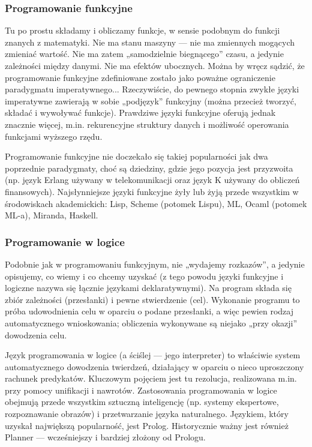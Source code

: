 \documentclass[a4paper,12pt,oneside]{book}
\begin{document}
				\subsubsection{Programowanie funkcyjne}
				Tu po prostu składamy i obliczamy funkcje, w sensie podobnym do funkcji znanych z matematyki. Nie ma stanu maszyny — nie ma zmiennych mogących zmieniać wartość. Nie ma zatem „samodzielnie biegnącego” czasu, a jedynie zależności między danymi. Nie ma efektów ubocznych. Można by wręcz sądzić, że programowanie funkcyjne zdefiniowane zostało jako poważne ograniczenie paradygmatu imperatywnego... Rzeczywiście, do pewnego stopnia zwykłe języki imperatywne zawierają w sobie „podjęzyk” funkcyjny (można przecież tworzyć, składać i wywoływać funkcje). Prawdziwe języki funkcyjne oferują jednak znacznie więcej, m.in. rekurencyjne struktury danych i możliwość operowania funkcjami wyższego rzędu.
				
				Programowanie funkcyjne nie doczekało się takiej popularności jak dwa poprzednie paradygmaty, choć są dziedziny, gdzie jego pozycja jest przyzwoita (np. język Erlang używany w telekomunikacji oraz język K używany do obliczeń finansowych). Najsłynniejsze języki funkcyjne żyły lub żyją przede wszystkim w środowiskach akademickich: Lisp, Scheme (potomek Lispu), ML, Ocaml (potomek ML-a), Miranda, Haskell.
				\subsubsection{Programowanie w logice}
				Podobnie jak w programowaniu funkcyjnym, nie „wydajemy rozkazów”, a jedynie opisujemy, co wiemy i co chcemy uzyskać (z tego powodu języki funkcyjne i logiczne nazywa się łącznie językami deklaratywnymi). Na program składa się zbiór zależności (przesłanki) i pewne stwierdzenie (cel). Wykonanie programu to próba udowodnienia celu w oparciu o podane przesłanki, a więc pewien rodzaj automatycznego wnioskowania; obliczenia wykonywane są niejako „przy okazji” dowodzenia celu.
				
				Język programowania w logice (a ściślej — jego interpreter) to właściwie system automatycznego dowodzenia twierdzeń, działający w oparciu o nieco uproszczony rachunek predykatów. Kluczowym pojęciem jest tu rezolucja, realizowana m.in. przy pomocy unifikacji i nawrotów. Zastosowania programowania w logice obejmują przede wszystkim sztuczną inteligencję (np. systemy ekspertowe, rozpoznawanie obrazów) i przetwarzanie języka naturalnego. Językiem, który uzyskał największą popularność, jest Prolog. Historycznie ważny jest również Planner — wcześniejszy i bardziej złożony od Prologu.
				
\end{document}
